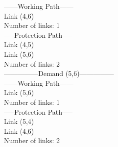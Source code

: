 ------Working Path------ \\
Link  (4,6) \\
Number of links: 1 \\

-----Protection Path----- \\
Link  (4,5) \\
Link  (5,6) \\
Number of links: 2 \\

---------------Demand (5,6)--------------- \\

------Working Path------ \\
Link  (5,6) \\
Number of links: 1 \\

-----Protection Path----- \\
Link  (5,4) \\
Link  (4,6) \\
Number of links: 2 \\